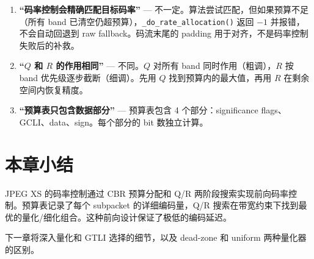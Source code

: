 \begin{misunderstanding}
\begin{enumerate}
  \item \textbf{``码率控制会精确匹配目标码率''} --- 不一定。算法尝试匹配，但如果预算不足（所有 band 已清空仍超预算），\texttt{\_do\_rate\_allocation()} 返回 $-1$ 并报错，不会自动回退到 raw fallback。码流末尾的 padding 用于对齐，不是码率控制失败后的补救。
  \item \textbf{``$Q$ 和 $R$ 的作用相同''} --- 不同。$Q$ 对所有 band 同时作用（粗调），$R$ 按 band 优先级逐步截断（细调）。先用 $Q$ 找到预算内的最大值，再用 $R$ 在剩余空间内恢复精度。
  \item \textbf{``预算表只包含数据部分''} --- 预算表包含 4 个部分：significance flags、GCLI、data、sign。每个部分的 bit 数独立计算。
\end{enumerate}
\end{misunderstanding}

\section{本章小结}

JPEG XS 的码率控制通过 CBR 预算分配和 Q/R 两阶段搜索实现前向码率控制。预算表记录了每个 subpacket 的详细编码量，Q/R 搜索在带宽约束下找到最优的量化/细化组合。这种前向设计保证了极低的编码延迟。

下一章将深入量化和 GTLI 选择的细节，以及 dead-zone 和 uniform 两种量化器的区别。
